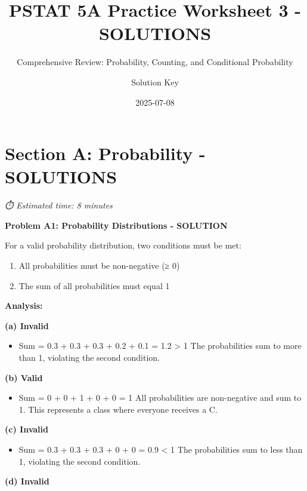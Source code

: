 \documentclass[
  11pt,
]{article}
\title{PSTAT 5A Practice Worksheet 3 - SOLUTIONS}
\subtitle{Comprehensive Review: Probability, Counting, and Conditional
Probability}
\author{Solution Key}
\date{2025-07-08}
\providecommand{\tightlist}{%
  \setlength{\itemsep}{0pt}\setlength{\parskip}{0pt}}\usepackage{longtable,booktabs,array}
\renewcommand*\contentsname{Table of contents}
\newcommand\contentsname{Table of contents}
\begin{document}
\maketitle

\renewcommand*\contentsname{Table of contents}
{
\hypersetup{linkcolor=}
\setcounter{tocdepth}{3}
\tableofcontents
}

\section{Section A: Probability -
SOLUTIONS}\label{section-a-probability---solutions}

\emph{⏱️ Estimated time: 8 minutes}

\textbf{Problem A1: Probability Distributions - SOLUTION}

For a valid probability distribution, two conditions must be met:

\begin{enumerate}
\def\labelenumi{\arabic{enumi}.}
\item
  All probabilities must be non-negative (≥ 0)
\item
  The sum of all probabilities must equal 1
\end{enumerate}

\textbf{Analysis:}

\textbf{(a) Invalid}

\begin{itemize}
\tightlist
\item
  Sum = 0.3 + 0.3 + 0.3 + 0.2 + 0.1 = 1.2 \textgreater{} 1 The
  probabilities sum to more than 1, violating the second condition.
\end{itemize}

\textbf{(b) Valid}

\begin{itemize}
\tightlist
\item
  Sum = 0 + 0 + 1 + 0 + 0 = 1 All probabilities are non-negative and sum
  to 1. This represents a class where everyone receives a C.
\end{itemize}

\textbf{(c) Invalid}

\begin{itemize}
\tightlist
\item
  Sum = 0.3 + 0.3 + 0.3 + 0 + 0 = 0.9 \textless{} 1 The probabilities
  sum to less than 1, violating the second condition.
\end{itemize}

\textbf{(d) Invalid}
\end{document}
